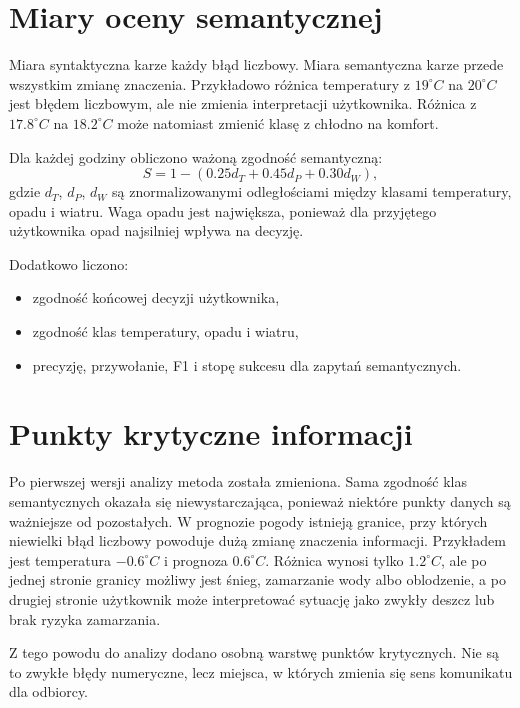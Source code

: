 \documentclass[a4paper,12pt]{article}
\begin{document}
\section{Miary oceny semantycznej}

Miara syntaktyczna karze każdy błąd liczbowy. Miara semantyczna karze przede
wszystkim zmianę znaczenia. Przykładowo różnica temperatury z \(19^\circ C\)
na \(20^\circ C\) jest błędem liczbowym, ale nie zmienia interpretacji
użytkownika. Różnica z \(17.8^\circ C\) na \(18.2^\circ C\) może natomiast
zmienić klasę z chłodno na komfort.

Dla każdej godziny obliczono ważoną zgodność semantyczną:
\[
S = 1 - (0.25 d_T + 0.45 d_P + 0.30 d_W),
\]
gdzie \(d_T\), \(d_P\), \(d_W\) są znormalizowanymi odległościami między
klasami temperatury, opadu i wiatru. Waga opadu jest największa, ponieważ dla
przyjętego użytkownika opad najsilniej wpływa na decyzję.

Dodatkowo liczono:
\begin{itemize}
    \item zgodność końcowej decyzji użytkownika,
    \item zgodność klas temperatury, opadu i wiatru,
    \item precyzję, przywołanie, F1 i stopę sukcesu dla zapytań semantycznych.
\end{itemize}

\section{Punkty krytyczne informacji}

Po pierwszej wersji analizy metoda została zmieniona. Sama zgodność klas
semantycznych okazała się niewystarczająca, ponieważ niektóre punkty danych są
ważniejsze od pozostałych. W prognozie pogody istnieją granice, przy których
niewielki błąd liczbowy powoduje dużą zmianę znaczenia informacji. Przykładem
jest temperatura \(-0.6^\circ C\) i prognoza \(0.6^\circ C\). Różnica wynosi
tylko \(1.2^\circ C\), ale po jednej stronie granicy możliwy jest śnieg,
zamarzanie wody albo oblodzenie, a po drugiej stronie użytkownik może
interpretować sytuację jako zwykły deszcz lub brak ryzyka zamarzania.

Z tego powodu do analizy dodano osobną warstwę punktów krytycznych. Nie są to
zwykłe błędy numeryczne, lecz miejsca, w których zmienia się sens komunikatu
dla odbiorcy.
\end{document}
